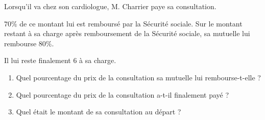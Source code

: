 \begin{exo}{}
	Lorsqu'il va chez son cardiologue, M. Charrier paye sa consultation.

	$70\%$ de ce montant lui est remboursé par la Sécurité sociale. Sur le montant restant à sa charge après remboursement de la Sécurité sociale, sa mutuelle lui rembourse $80\%$.

	Il lui reste finalement $6$\eur{} à sa charge.
	\begin{enumerate}
		\item Quel pourcentage du prix de la consultation sa mutuelle lui rembourse-t-elle ?
		\item Quel pourcentage du prix de la consultation a-t-il finalement payé ?
		\item Quel était le montant de sa consultation au départ ?
	\end{enumerate}
\end{exo}
